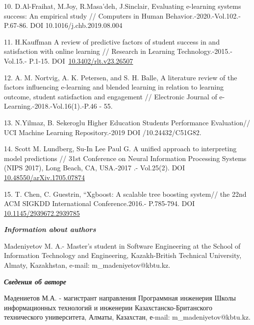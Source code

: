 \begin{references}
10. D.Al-Fraihat, M.Joy, R.Masa'deh, J.Sinclair, Evaluating e-learning
systems success: An empirical study // Computers in Human
Behavior.-2020.-Vol.102.-P.67-86. DOI 10.1016/j.chb.2019.08.004

11. H.Kauffman A review of predictive factors of student success in and
satisfaction with online learning // Research in Learning
Technology.-2015.-Vol.15.- P.1-15.
DOI~\href{https://doi.org/10.3402/rlt.v23.26507}{10.3402/rlt.v23.26507}

12. A. M. Nortvig, A. K. Petersen, and S. H. Balle, A literature review
of the factors influencing e-learning and blended learning in relation
to learning outcome, student satisfaction and engagement // Electronic
Journal of e-Learning.-2018.-Vol.16(1).-P.46 - 55.

13. N.Yilmaz, B. Sekeroglu Higher Education Students Performance
Evaluation// UCI Machine Learning Repository.-2019 DOI /10.24432/C51G82.

14. Scott M. Lundberg, Su-In Lee Paul G. A unified approach to
interpreting model predictions // 31st Conference on Neural Information
Processing Systems (NIPS 2017), Long Beach, CA, USA.-2017 .- Vol.25(2).
DOI
\href{http://dx.doi.org/10.48550/arXiv.1705.07874}{10.48550/arXiv.1705.07874}

15. T. Chen, C. Guestrin, ``Xgboost: A scalable tree boosting system//
the 22nd ACM SIGKDD International Conference.2016.- P.785-794. DOI
\href{http://dx.doi.org/10.1145/2939672.2939785}{10.1145/2939672.2939785}
\end{references}

\begin{authorinfo}
\hspace{1em}\emph{{\bfseries Information about authors}}

Madeniyetov M. A.- Master's student in Software Engineering at the
School of Information Technology and Engineering, Kazakh-British
Technical University, Almaty, Kazakhstan, e-mail:
m\_madeniyetov@kbtu.kz.

\hspace{1em}\emph{{\bfseries Сведения об авторе}}

Мәдениетов М.А. - магистрант направления Программная инженерия Школы
информационных технологий и инженерии Казахстанско-Британского
технического университета, Алматы, Казахстан, е-mail:
m\_madeniyetov@kbtu.kz.
\end{authorinfo}
